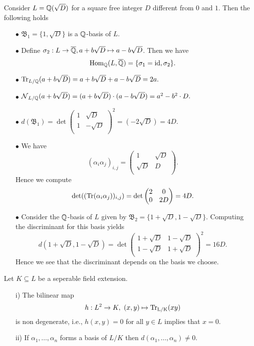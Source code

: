 \begin{Bsp}
	Consider $L=\mathbb{Q}(\sqrt{D})$ for a square free integer $D$ different from $0$ and $1$. Then the following holds
	\begin{itemize}
		\item [$\bullet$] $\mathfrak{B}_1=\{1,\sqrt{D} \}$ is a $\mathbb{Q}$-basis of $L$.
		\item [$\bullet$] Define $\sigma_2:L\to\overline{\mathbb{Q}},a+b\sqrt{D}\mapsto a-b\sqrt{D}$. Then we have $$\operatorname{Hom}_{\mathbb{Q}}(L,\overline{\mathbb{Q}})=\{\sigma_1=\operatorname{id},\sigma_2 \}.$$
		\item [$\bullet$] $\operatorname{Tr}_{L/\mathbb{Q}}(a+b\sqrt{D})= a+b\sqrt{D}+a-b\sqrt{D}=2a.$
		\item [$\bullet$]$\operatorname{\mathcal{N}}_{L/\mathbb{Q}}(a+b\sqrt{D})= (a+b\sqrt{D})\cdot(a-b\sqrt{D})=a^2-b^2\cdot D.$
		\item [$\bullet$] $d(\mathfrak{B}_1)=\det
		\begin{pmatrix}
		1 & \sqrt{D} \\
		1 & -\sqrt{D} \\
		\end{pmatrix}^2=(-2\sqrt{D})=4D.$
		\item [$\bullet$] We have $$(\alpha_i\alpha_j)_{i,j}=\begin{pmatrix}
		1 & \sqrt{D} \\
		\sqrt{D} & D \\
		\end{pmatrix}.$$
		Hence we compute
		$$\det((\operatorname{Tr}(\alpha_i\alpha_j))_{i,j})=\det\begin{pmatrix}
		2 & 0 \\
		0 & 2D \\
		\end{pmatrix}=4D.$$
		\item [$\bullet$] Consider the $\mathbb{Q}$-basis of $L$ given by $\mathfrak{B}_2=\{1+\sqrt{D},1-\sqrt{D} \}$. Computing the discriminant for this basis yields
		$$d(1+\sqrt{D},1-\sqrt{D})=\det\begin{pmatrix}
		1+\sqrt{D} & 1-\sqrt{D} \\
		1-\sqrt{D} & 1+\sqrt{D} \\
		\end{pmatrix}^2=16D.$$
		Hence we see that the discriminant depends on the basis we choose.
	\end{itemize}
\end{Bsp}

\begin{Prop}
	Let $K\subseteq L$ be a seperable field extension. 
	\begin{itemize}
		\item [i)] The bilinear map $$h:L^2\to K,~(x,y)\mapsto\operatorname{\operatorname{Tr}_{L/K}}(xy)$$ is non degenerate, i.e., $h(x,y)=0$ for all $y\in L$ implies that $x=0$.
		\item [ii)] If $\alpha_1,\dots,\alpha_n$ forms a basis of $L/K$ then $d(\alpha_1,\dots,\alpha_n)\neq 0$.
	\end{itemize}
\end{Prop}

